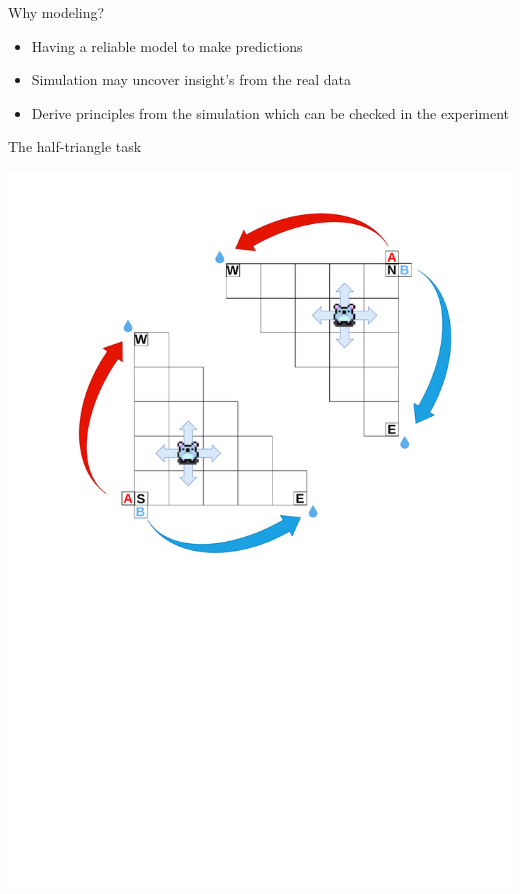 \documentclass[bigger]{beamer}
\begin{document}
\begin{frame}[<+->][label={sec:org579169d}]{Why modeling?}
\begin{itemize}
\item Having a reliable model to make predictions
\item Simulation may uncover insight's from the real data
\item Derive principles from the simulation which can be checked in the experiment
\end{itemize}
\end{frame}
\begin{frame}[label={sec:orgd5f7ab7}]{The half-triangle task}
\begin{center}
\includegraphics[width=.9\linewidth]{img/RL_env-triangle-task.drawio.pdf}
\end{center}
\end{frame}
\end{document}
